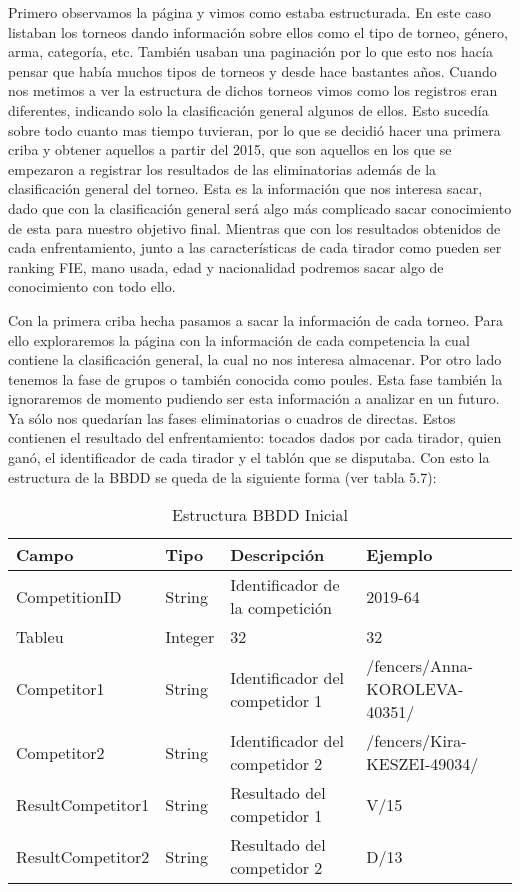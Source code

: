 Primero observamos la página y vimos como estaba estructurada. En este caso listaban
los torneos dando información sobre ellos como el tipo de torneo, género, arma, categoría,
etc. También usaban una paginación por lo que esto nos hacía pensar que había muchos tipos
de torneos y desde hace bastantes años. Cuando nos metimos a ver la estructura de dichos torneos
vimos como los registros eran diferentes, indicando solo la clasificación general algunos de ellos.
Esto sucedía sobre todo cuanto mas tiempo tuvieran, por lo que se decidió hacer una primera
criba y obtener aquellos a partir del 2015, que son aquellos en los que se empezaron a registrar
los resultados de las eliminatorias además de la clasificación general del torneo. Esta es la
información que nos interesa sacar, dado que con la clasificación general será algo más
complicado sacar conocimiento de esta para nuestro objetivo final. Mientras que con los
resultados obtenidos de cada enfrentamiento, junto a las características de cada tirador
como pueden ser ranking FIE, mano usada, edad y nacionalidad podremos sacar algo de
conocimiento con todo ello.

Con la primera criba hecha pasamos a sacar la información de cada torneo. Para ello exploraremos
la página con la información de cada competencia la cual contiene la clasificación general,
la cual no nos interesa almacenar. Por otro lado tenemos la fase de grupos o también
conocida como poules. Esta fase también la ignoraremos de momento pudiendo ser esta
información a analizar en un futuro. Ya sólo nos quedarían las fases eliminatorias o
cuadros de directas. Estos contienen el resultado del enfrentamiento: tocados dados por cada tirador,
quien ganó, el identificador de cada tirador y el tablón que se disputaba. Con esto la estructura de la BBDD
se queda de la siguiente forma (ver tabla 5.7):

\begin{table}[]
  \centering
  \caption{Estructura BBDD Inicial}
  \label{tab:Estructura BBDD Inicial}
  \begin{tabular}{|llll|}
    \hline \rowcolor[HTML]{C0C0C0}
    Campo & Tipo & Descripción & Ejemplo \\ \hline
    CompetitionID & String & Identificador de la competición & 2019-64 \\ \hline
    Tableu & Integer & 32 & 32 \\ \hline
    Competitor1 & String & Identificador del competidor 1 & /fencers/Anna-KOROLEVA-40351/ \\ \hline
    Competitor2 & String & Identificador del competidor 2 & /fencers/Kira-KESZEI-49034/ \\ \hline
    ResultCompetitor1 & String & Resultado del competidor 1 & V/15 \\ \hline
    ResultCompetitor2 & String & Resultado del competidor 2 & D/13 \\ \hline
  \end{tabular}
\end{table}

